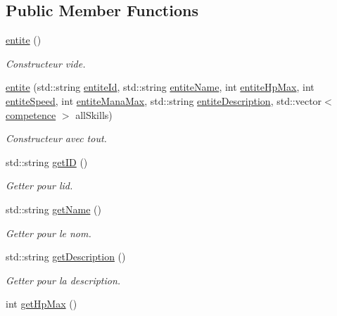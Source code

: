 \subsection*{Public Member Functions}
\begin{DoxyCompactItemize}
\item 
\hyperlink{classentite_a41b83303ba28a228fdfad7de3eed40fe}{entite} ()
\begin{DoxyCompactList}\small\item\em Constructeur vide. \end{DoxyCompactList}\item 
\hyperlink{classentite_a5e655b5c1999ae75dfca0b32de737b1e}{entite} (std\+::string \hyperlink{classentite_a904e8783de9fe2fc4306bf6b7822d025}{entite\+Id}, std\+::string \hyperlink{classentite_abe631a515b1cd0866dcfb078c4ceb07a}{entite\+Name}, int \hyperlink{classentite_a754557f56c1c1fcbcbd40eec68b60f65}{entite\+Hp\+Max}, int \hyperlink{classentite_ad9df70a9bb07f07b3ebf520941c3a35f}{entite\+Speed}, int \hyperlink{classentite_a696167d32c27b3b2a2fa6b473a888b18}{entite\+Mana\+Max}, std\+::string \hyperlink{classentite_a6fab1d9a04ade2cb97ec0904b12c82c9}{entite\+Description}, std\+::vector$<$ \hyperlink{classcompetence}{competence} $>$ all\+Skills)
\begin{DoxyCompactList}\small\item\em Constructeur avec tout. \end{DoxyCompactList}\item 
std\+::string \hyperlink{classentite_a3af765474e7f288752f24334d0fc6bbd}{get\+ID} ()
\begin{DoxyCompactList}\small\item\em Getter pour l\textquotesingle{}id. \end{DoxyCompactList}\item 
std\+::string \hyperlink{classentite_a0ebd43d682f234a39faa04bb34173d03}{get\+Name} ()
\begin{DoxyCompactList}\small\item\em Getter pour le nom. \end{DoxyCompactList}\item 
std\+::string \hyperlink{classentite_ab19b8d18b4d947c85063b2225bbb9144}{get\+Description} ()
\begin{DoxyCompactList}\small\item\em Getter pour la description. \end{DoxyCompactList}\item 
int \hyperlink{classentite_ab8e6c4dd900884cba5bec025f1e55999}{get\+Hp\+Max} ()

\end{DoxyCompactItemize}

